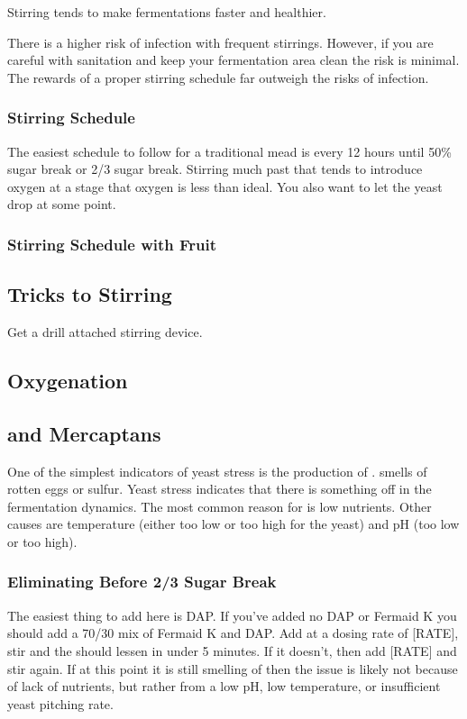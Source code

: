 \documentclass{article}
\begin{document}
  Stirring tends to make fermentations faster and healthier. 

  There is a higher risk of infection with frequent stirrings. However, if you are careful with sanitation and keep your fermentation area clean the risk is minimal.
  The rewards of a proper stirring schedule far outweigh the risks of infection.

  \subsubsection{Stirring Schedule}
   The easiest schedule to follow for a traditional mead is every 12 hours until 50\% sugar break or 2/3 sugar break. Stirring much past that tends to introduce
   oxygen at a stage that oxygen is less than ideal. You also want to let the yeast drop at some point.

  \subsubsection{Stirring Schedule with Fruit}

  \subsection{Tricks to Stirring}
   Get a drill attached stirring device.

  \subsection{Oxygenation}

 \subsection{ and Mercaptans}
  One of the simplest indicators of yeast stress is the production of .  smells of rotten eggs or sulfur. Yeast stress indicates that there is
  something off in the fermentation dynamics. The most common reason for  is low nutrients. Other causes are temperature (either too low or too high for 
  the yeast) and pH (too low or too high).

  \subsubsection{Eliminating Before 2/3 Sugar Break}
   The easiest thing to add here is DAP. If you've added no DAP or Fermaid K you should add a 70/30 mix of Fermaid K and DAP. Add at a dosing rate of [RATE], stir and the 
    should lessen in under 5 minutes. If it doesn't, then add [RATE] and stir again. If at this point it is still smelling of  then the issue is likely
   not because of lack of nutrients, but rather from a low pH, low temperature, or insufficient yeast pitching rate.
\end{document}
